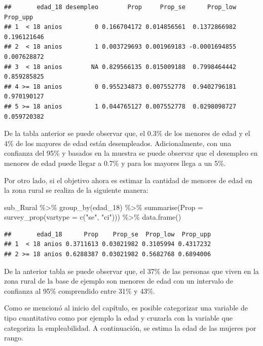 \documentclass[
  12pt,
]{book}
\newenvironment{Shaded}{\begin{snugshade}}{\end{snugshade}}
\newcommand{\AttributeTok}[1]{\textcolor[rgb]{0.77,0.63,0.00}{#1}}
\newcommand{\FunctionTok}[1]{\textcolor[rgb]{0.00,0.00,0.00}{#1}}
\newcommand{\NormalTok}[1]{#1}
\newcommand{\SpecialCharTok}[1]{\textcolor[rgb]{0.00,0.00,0.00}{#1}}
\newcommand{\StringTok}[1]{\textcolor[rgb]{0.31,0.60,0.02}{#1}}
\begin{document}
\begin{verbatim}
##       edad_18 desempleo        Prop     Prop_se      Prop_low    Prop_upp
## 1  < 18 anios         0 0.166704172 0.014856561  0.1372866982 0.196121646
## 2  < 18 anios         1 0.003729693 0.001969183 -0.0001694855 0.007628872
## 3  < 18 anios        NA 0.829566135 0.015009188  0.7998464442 0.859285825
## 4 >= 18 anios         0 0.955234873 0.007552778  0.9402796181 0.970190127
## 5 >= 18 anios         1 0.044765127 0.007552778  0.0298098727 0.059720382
\end{verbatim}

De la tabla anterior se puede observar que, el 0.3\% de los menores de edad y el 4\% de los mayores de edad están desempleados. Adicionalmente, con una confianza del 95\% y basados en la muestra se puede observar que el desempleo en menores de edad puede llegar a 0.7\% y para los mayores llega a un 5\%.

Por otro lado, si el objetivo ahora es estimar la cantidad de menores de edad en la zona rural se realiza de la siguiente manera:

\begin{Shaded}
\begin{Highlighting}[]
\NormalTok{sub\_Rural }\SpecialCharTok{\%\textgreater{}\%} \FunctionTok{group\_by}\NormalTok{(edad\_18) }\SpecialCharTok{\%\textgreater{}\%} 
              \FunctionTok{summarise}\NormalTok{(}\AttributeTok{Prop =} \FunctionTok{survey\_prop}\NormalTok{(}\AttributeTok{vartype =}  \FunctionTok{c}\NormalTok{(}\StringTok{"se"}\NormalTok{, }\StringTok{"ci"}\NormalTok{))) }\SpecialCharTok{\%\textgreater{}\%}
              \FunctionTok{data.frame}\NormalTok{()}
\end{Highlighting}
\end{Shaded}

\begin{verbatim}
##       edad_18      Prop    Prop_se  Prop_low  Prop_upp
## 1  < 18 anios 0.3711613 0.03021982 0.3105994 0.4317232
## 2 >= 18 anios 0.6288387 0.03021982 0.5682768 0.6894006
\end{verbatim}

De la anterior tabla se puede observar que, el 37\% de las personas que viven en la zona rural de la base de ejemplo son menores de edad con un intervalo de confianza al 95\% comprendido entre 31\% y 43\%.

Como se mencionó al inicio del capítulo, es posible categorizar una variable de tipo cuantitativo como por ejemplo la edad y cruzarla con la variable que categoriza la empleabilidad. A continuación, se estima la edad de las mujeres por rango.
\end{document}
